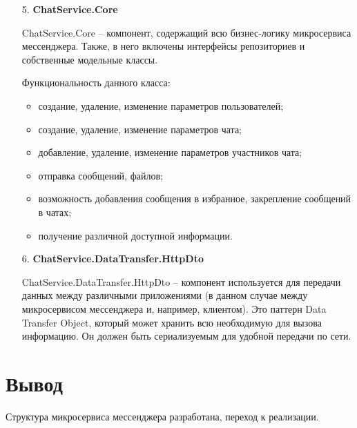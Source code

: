 \begin{enumerate}
\item[5. ] \textbf{ChatService.Core}

ChatService.Core -- компонент, содержащий всю бизнес-логику микросервиса мессенджера. Также, в него включены интерфейсы репозиториев и собственные модельные классы. 

Функциональность данного класса:
\begin{itemize}
\item создание, удаление, изменение параметров пользователей;
\item создание, удаление, изменение параметров чата;
\item добавление, удаление, изменение параметров участников чата;
\item отправка сообщений, файлов;
\item возможность добавления сообщения в избранное, закрепление сообщений в чатах;
\item получение различной доступной информации.  
\end{itemize}

\item[6. ] \textbf{ChatService.DataTransfer.HttpDto}

ChatService.DataTransfer.HttpDto -- компонент используется для передачи данных между различными приложениями (в данном случае между микросервисом мессенджера и, например, клиентом). Это паттерн Data Transfer Object, который может хранить всю необходимую для вызова информацию. Он должен быть сериализуемым для удобной передачи по сети.

\end{enumerate}

\section{\textbf{Вывод}}

\hfill

Структура микросервиса мессенджера разработана, переход к реализации. 
